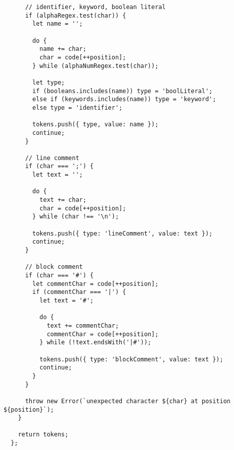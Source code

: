 \begin{verbatim}
      // identifier, keyword, boolean literal
      if (alphaRegex.test(char)) {
        let name = '';

        do {
          name += char;
          char = code[++position];
        } while (alphaNumRegex.test(char));

        let type;
        if (booleans.includes(name)) type = 'boolLiteral';
        else if (keywords.includes(name)) type = 'keyword';
        else type = 'identifier';

        tokens.push({ type, value: name });
        continue;
      }

      // line comment
      if (char === ';') {
        let text = '';

        do {
          text += char;
          char = code[++position];
        } while (char !== '\n');

        tokens.push({ type: 'lineComment', value: text });
        continue;
      }

      // block comment
      if (char === '#') {
        let commentChar = code[++position];
        if (commentChar === '|') {
          let text = '#';

          do {
            text += commentChar;
            commentChar = code[++position];
          } while (!text.endsWith('|#'));

          tokens.push({ type: 'blockComment', value: text });
          continue;
        }
      }

      throw new Error(`unexpected character ${char} at position ${position}`);
    }

    return tokens;
  };
\end{verbatim}

